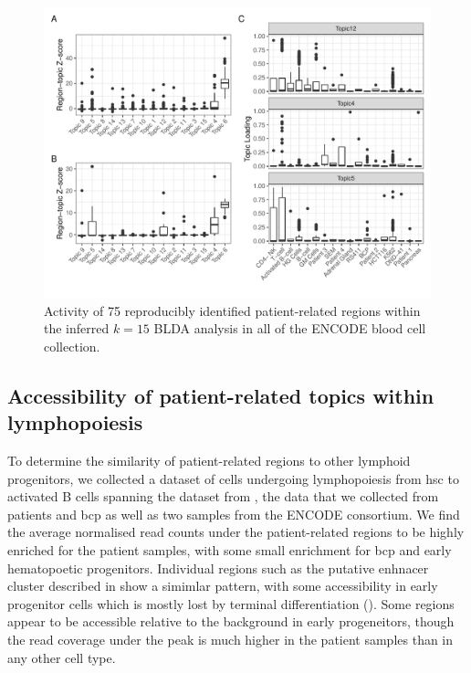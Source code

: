 \begin{figure}[]
    \centering
    \includegraphics[width=\textwidth]{plot/ch5/encode_pt_regions.pdf} 
    \caption{Activity of 75 reproducibly identified patient-related regions within the inferred $k=15$ BLDA analysis in all of the ENCODE blood cell collection.}
    \label{fig:encode_pt_regions_topics}
\end{figure}

\subsection{Accessibility of patient-related topics within lymphopoiesis}

To determine the similarity of patient-related regions to other lymphoid progenitors, we collected a dataset of cells undergoing lymphopoiesis from \gls{hsc} to activated B cells spanning the dataset from \textcite{Corces2016}, the data that we collected from patients and \gls{bcp} as well as two samples from the ENCODE consortium.  We find the average normalised read counts under the patient-related regions to be highly enriched for the patient samples, with some small enrichment for \gls{bcp} and early hematopoetic progenitors. 
Individual regions such as the putative enhnacer cluster described in  show a simimlar pattern, with some accessibility in early progenitor cells which is mostly lost by terminal differentiation (). 
Some regions appear to be accessible relative to the background in early progeneitors, though the read coverage under the peak is much higher in the patient samples than in any other cell type. 

